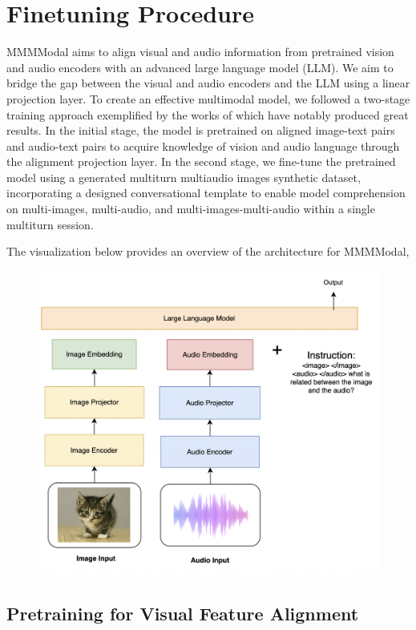 \documentclass[preprint]{article}
\begin{document}
\section{Finetuning Procedure}

MMMModal aims to align visual and audio information from pretrained vision and audio encoders with an advanced large language model (LLM). We aim to bridge the gap between the visual and audio encoders and the LLM using a linear projection layer. To create an effective multimodal model, we followed a two-stage training approach exemplified by the works of \cite{han2023chartllama,zhu2023minigpt4,liu2024hidden} which have notably produced great results. In the initial stage, the model is pretrained on aligned image-text pairs and audio-text pairs to acquire knowledge of vision and audio language through the alignment projection layer. In the second stage, we fine-tune the pretrained model using a generated multiturn multiaudio images synthetic dataset, incorporating a designed conversational template to enable model comprehension on multi-images, multi-audio, and multi-images-multi-audio within a single multiturn session.

The visualization below provides an overview of the architecture for MMMModal,

\begin{figure}[hbt!]
  \centering
  \includegraphics[width=0.6\linewidth]{pic/overall-architecture.png} %
\end{figure}

\subsection{Pretraining for Visual Feature Alignment}\label{sec:visual-alignment}
\end{document}
